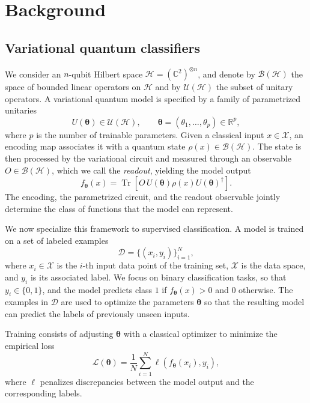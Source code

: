 \documentclass[aps,pra,reprint,superscriptaddress,longbibliography]{revtex4-2}
\newcommand{\tr}{\operatorname{Tr}}
\newcommand{\Hi}{\mathcal{H}}
\begin{document}
\section{Background}\label{sec:background}

\subsection{Variational quantum classifiers}
We consider an \(n\)-qubit Hilbert space
\(\Hi=(\mathbb{C}^{2})^{\otimes n}\), and denote by
\(\mathcal{B}(\Hi)\) the space of bounded linear operators on
\(\Hi\) and by \(\mathcal{U}(\Hi)\) the subset of unitary operators. A variational quantum model is specified by a family of
parametrized unitaries
\begin{equation}
    U(\boldsymbol{\theta})\in\mathcal{U}(\Hi),
    \qquad
    \boldsymbol{\theta}=(\theta_1,\ldots,\theta_p)\in\mathbb{R}^{p},
\end{equation}
where \(p\) is the number of trainable parameters. Given a classical input
\(x\in\mathcal{X}\), an encoding map associates it with a quantum state
\(\rho(x)\in\mathcal{B}(\Hi)\). The state is then processed by the
variational circuit and measured through an observable
\(O\in\mathcal{B}(\Hi)\), which we call the \emph{readout}, yielding the model output
\begin{equation}
    f_{\boldsymbol{\theta}}(x)
    =
    \tr\!\left[
        O\,U(\boldsymbol{\theta})\rho(x)
        U(\boldsymbol{\theta})^{\dagger}
    \right].
\end{equation}
The encoding, the parametrized circuit, and the readout observable jointly
determine the class of functions that the model can represent.

We now specialize this framework to supervised classification. A model is
trained on a set of labeled examples
\begin{equation}
    \mathcal D=\{(x_i,y_i)\}_{i=1}^{N},
\end{equation}
where \(x_i\in\mathcal{X}\) is the \(i\)-th input data point of the training
set, \(\mathcal{X}\) is the data space, and \(y_i\) is its associated label.
We focus on binary classification tasks, so that \(y_i\in\{0,1\}\), and the model predicts class $1$ if \(f_{\boldsymbol{\theta}}(x)>0\) and \(0\) otherwise. The
examples in \(\mathcal D\) are used to optimize the parameters
\(\boldsymbol{\theta}\) so that the resulting model can predict the labels of
previously unseen inputs.

Training consists of adjusting \(\boldsymbol{\theta}\) with a classical
optimizer to minimize the empirical loss
\begin{equation}\label{eq:Loss}
    \mathcal{L}(\boldsymbol{\theta})
    =
    \frac{1}{N}
    \sum_{i=1}^{N}
    \ell\!\left(f_{\boldsymbol{\theta}}(x_i),y_i\right),
\end{equation}
where \(\ell\) penalizes discrepancies between the model output and the
corresponding labels.
\end{document}
